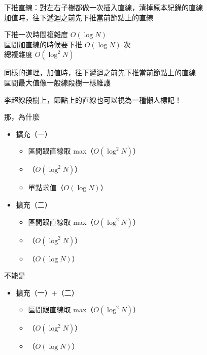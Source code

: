 \begin{frame}{}
    下推直線：對左右子樹都做一次插入直線，清掉原本紀錄的直線 \\
    加值時，往下遞迴之前先下推當前節點上的直線

    下推一次時間複雜度 $O(\log N)$\\
    區間加直線的時候要下推 $O(\log N)$ 次\\
    總複雜度 $O(\log^2 N)$
\end{frame}

\begin{frame}{}
    同樣的道理，加值時，往下遞迴之前先下推當前節點上的直線\\
    區間最大值像一般線段樹一樣維護
\end{frame}

\begin{frame}{}
    李超線段樹上，節點上的直線也可以視為一種懶人標記！
\end{frame}

\begin{frame}{}
    那，為什麼

    \begin{itemize}
        \item 擴充（一）
        \begin{itemize}
            \item 區間跟直線取 max（$O(\log^2 N)$）
            \item {}（$O(\log^2 N)$）
            \item 單點求值（$O(\log N)$）
        \end{itemize}

        \item 擴充（二）
        \begin{itemize}
            \item 區間跟直線取 max（$O(\log^2 N)$）
            \item {}（$O(\log^2 N)$）
            \item {}（$O(\log N)$）
        \end{itemize}
    \end{itemize}

    不能是

    \begin{itemize}
        \item 擴充（一）$+$（二）
        \begin{itemize}
            \item 區間跟直線取 max（$O(\log^2 N)$）
            \item {}（$O(\log^2 N)$）
            \item {}（$O(\log N)$）
        \end{itemize}
    \end{itemize}
\end{frame}

